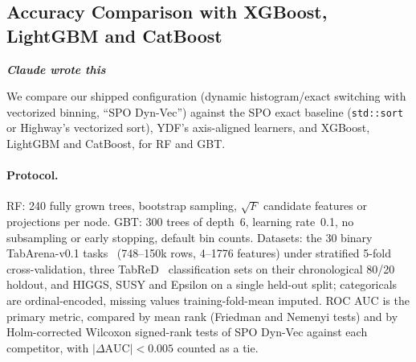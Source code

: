 \subsection{Accuracy Comparison with XGBoost, LightGBM and CatBoost}
\label{sec:spo-vs-gbt}

\textbf{\textit{Claude wrote this}}

We compare our shipped configuration (dynamic histogram/exact switching with vectorized
binning, ``SPO Dyn-Vec'') against the SPO exact baseline (\texttt{std::sort} or Highway's
vectorized sort), YDF's axis-aligned learners, and XGBoost, LightGBM and CatBoost, for RF and
GBT.

\paragraph{Protocol.}
RF: 240 fully grown trees, bootstrap sampling, $\sqrt{F}$ candidate features or projections per
node. GBT: 300 trees of depth~6, learning rate~0.1, no subsampling or early stopping, default
bin counts. Datasets: the 30 binary TabArena-v0.1 tasks~\cite{tabarena} (748--150k rows,
4--1776 features) under stratified 5-fold cross-validation, three TabReD~\cite{tabred}
classification sets on their chronological 80/20 holdout, and HIGGS, SUSY and Epsilon on a
single held-out split; categoricals are ordinal-encoded, missing values training-fold-mean
imputed. ROC AUC is the primary metric, compared by mean rank (Friedman and Nemenyi tests) and
by Holm-corrected Wilcoxon signed-rank tests of SPO Dyn-Vec against each competitor, with
$|\Delta\mathrm{AUC}|<0.005$ counted as a tie.


